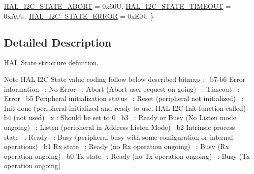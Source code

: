 \begin{DoxyCompactItemize}
\newline
\mbox{\hyperlink{group___h_a_l__state__structure__definition_ggaef355af8eab251ae2a19ee164ad81c37a2c6f6d1fef0847f9da51153b5c295249}{H\+A\+L\+\_\+\+I2\+C\+\_\+\+S\+T\+A\+T\+E\+\_\+\+A\+B\+O\+RT}} = 0x60U, 
\mbox{\hyperlink{group___h_a_l__state__structure__definition_ggaef355af8eab251ae2a19ee164ad81c37a378abf24301fe7a23620fd78ff3f168b}{H\+A\+L\+\_\+\+I2\+C\+\_\+\+S\+T\+A\+T\+E\+\_\+\+T\+I\+M\+E\+O\+UT}} = 0x\+A0U, 
\mbox{\hyperlink{group___h_a_l__state__structure__definition_ggaef355af8eab251ae2a19ee164ad81c37afe3c9b304462901099426a0d414be2a2}{H\+A\+L\+\_\+\+I2\+C\+\_\+\+S\+T\+A\+T\+E\+\_\+\+E\+R\+R\+OR}} = 0x\+E0U
 \}
\end{DoxyCompactItemize}


\subsection{Detailed Description}
H\+AL State structure definition. 

\begin{DoxyNote}{Note}
H\+AL I2C State value coding follow below described bitmap \+:~\newline
 b7-\/b6 Error information~ \+: No Error~ \+: Abort (Abort user request on going)~ \+: Timeout~ \+: Error~\newline
 b5 Peripheral initialization status~ \+: Reset (peripheral not initialized)~ \+: Init done (peripheral initialized and ready to use. H\+AL I2C Init function called)~\newline
 b4 (not used)~\newline
 x \+: Should be set to 0~\newline
 b3~ \+: Ready or Busy (No Listen mode ongoing)~ \+: Listen (peripheral in Address Listen Mode)~\newline
 b2 Intrinsic process state~ \+: Ready~ \+: Busy (peripheral busy with some configuration or internal operations)~\newline
 b1 Rx state~ \+: Ready (no Rx operation ongoing)~ \+: Busy (Rx operation ongoing)~\newline
 b0 Tx state~ \+: Ready (no Tx operation ongoing)~ \+: Busy (Tx operation ongoing) 
\end{DoxyNote}


